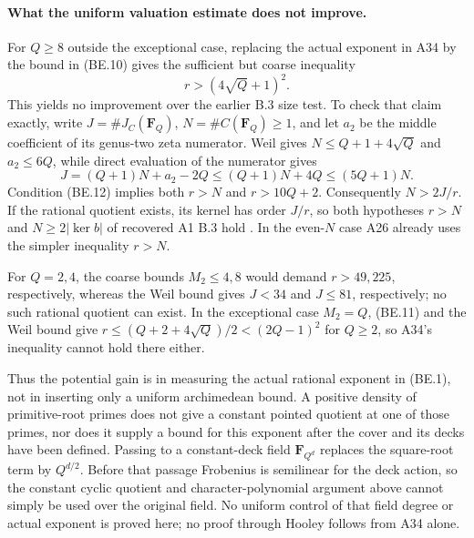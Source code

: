 \paragraph{What the uniform valuation estimate does not improve.}
For $Q\ge8$ outside the exceptional case, replacing the
actual exponent in A34 by the bound in (BE.10) gives the
sufficient but coarse inequality
\[
                         r>(4\sqrt Q+1)^2.
 \tag{BE.12}
\]
This yields no improvement over the earlier B.3 size test.
To check that claim exactly, write $J=\#J_C(\mathbf F_Q)$,
$N=\#C(\mathbf F_Q)\ge1$, and let $a_2$ be the middle
coefficient of its genus-two zeta numerator. Weil gives
$N\le Q+1+4\sqrt Q$ and $a_2\le6Q$, while direct evaluation
of the numerator gives
\[
             J=(Q+1)N+a_2-2Q
                   \le(Q+1)N+4Q\le(5Q+1)N.
 \tag{BE.13}
\]
Condition (BE.12) implies both $r>N$ and $r>10Q+2$.
Consequently $N>2J/r$. If the rational quotient exists,
its kernel has order $J/r$, so both hypotheses
$r>N$ and $N\ge2|\ker b|$ of recovered A1 B.3 hold
\cite[B.3]{A1run}. In the even-$N$ case A26 already uses
the simpler inequality $r>N$.

For $Q=2,4$, the coarse bounds $M_2\le4,8$ would demand
$r>49,225$, respectively, whereas the Weil bound gives
$J<34$ and $J\le81$, respectively; no such rational
quotient can exist. In the exceptional case $M_2=Q$,
(BE.11) and the Weil bound give
$r\le(Q+2+4\sqrt Q)/2<(2Q-1)^2$ for $Q\ge2$, so A34's
inequality cannot hold there either.

Thus the potential gain is in measuring the actual rational
exponent in (BE.1), not in inserting only a uniform archimedean
bound. A positive density of primitive-root primes does not
give a constant pointed quotient at one of those primes, nor
does it supply a bound for this exponent after the cover and
its decks have been defined. Passing to a constant-deck field
$\mathbf F_{Q^d}$ replaces the square-root term by $Q^{d/2}$.
Before that passage Frobenius is semilinear for the deck action,
so the constant cyclic quotient and character-polynomial
argument above cannot simply be used over the original field.
No uniform control of that field degree or actual exponent is
proved here; no proof through Hooley follows from A34 alone.
